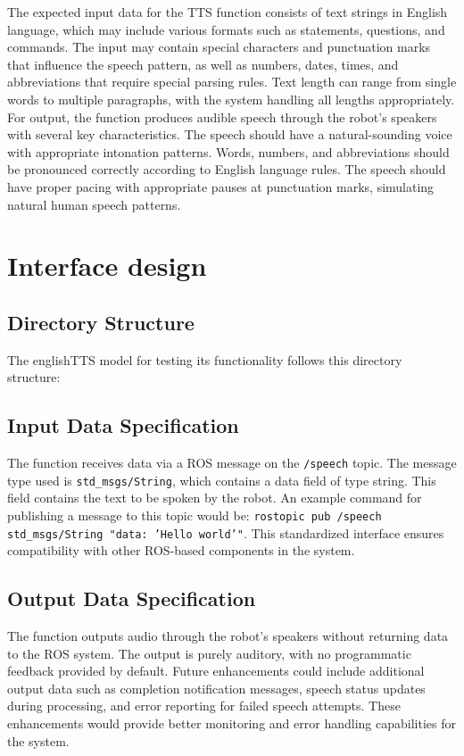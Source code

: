 \documentclass{CSSRforAfrica}
\begin{document}
The expected input data for the TTS function consists of text strings in English language, which may include various formats such as statements, questions, and commands. The input may contain special characters and punctuation marks that influence the speech pattern, as well as numbers, dates, times, and abbreviations that require special parsing rules. Text length can range from single words to multiple paragraphs, with the system handling all lengths appropriately.\\
For output, the function produces audible speech through the robot's speakers with several key characteristics. The speech should have a natural-sounding voice with appropriate intonation patterns. Words, numbers, and abbreviations should be pronounced correctly according to English language rules. The speech should have proper pacing with appropriate pauses at punctuation marks, simulating natural human speech patterns.


\newpage
\section{Interface design}
\subsection{Directory Structure}

The englishTTS model for testing its functionality follows this directory structure:

\vspace{1cm}
\vspace{1cm}

\subsection{Input Data Specification}
The function receives data via a ROS message on the \texttt{/speech} topic. The message type used is \texttt{std\_msgs/String}, which contains a data field of type string. This field contains the text to be spoken by the robot. An example command for publishing a message to this topic would be: \texttt{rostopic pub /speech std\_msgs/String "data: 'Hello world'"}. This standardized interface ensures compatibility with other ROS-based components in the system.
\subsection{Output Data Specification}
The function outputs audio through the robot's speakers without returning data to the ROS system. The output is purely auditory, with no programmatic feedback provided by default. Future enhancements could include additional output data such as completion notification messages, speech status updates during processing, and error reporting for failed speech attempts. These enhancements would provide better monitoring and error handling capabilities for the system.
\end{document}
